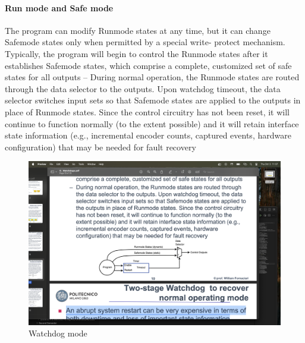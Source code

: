 \paragraph*{Run mode and Safe mode}
The program can modify Runmode states at any time, but it can
change Safemode states only when permitted by a special write-
protect mechanism. Typically, the program will begin to control the
Runmode states after it establishes Safemode states, which
comprise a complete, customized set of safe states for all outputs
– During normal operation, the Runmode states are routed through
the data selector to the outputs. Upon watchdog timeout, the data
selector switches input sets so that Safemode states are applied to
the outputs in place of Runmode states. Since the control circuitry
has not been reset, it will continue to function normally (to the
extent possible) and it will retain interface state information (e.g.,
incremental encoder counts, captured events, hardware
configuration) that may be needed for fault recovery
\begin{figure}[H]
    \centering
    \includegraphics[width=0.75\linewidth]{images/wdog1.png}
    \caption{Watchdog mode}
\end{figure}

